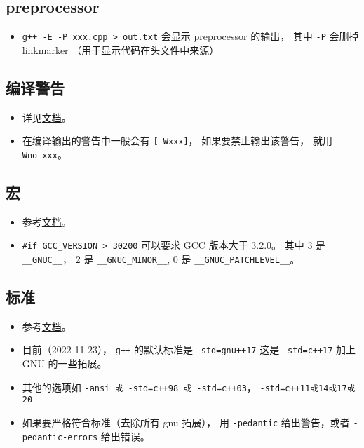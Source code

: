 \subsection{preprocessor}
\begin{itemize}
\item \verb|g++ -E -P xxx.cpp > out.txt| 会显示 preprocessor 的输出， 其中 \verb|-P| 会删掉 linkmarker （用于显示代码在头文件中来源）
\end{itemize}

\subsection{编译警告}
\begin{itemize}
\item 详见\href{https://gcc.gnu.org/onlinedocs/gcc/Warning-Options.html}{文档}。
\item 在编译输出的警告中一般会有 \verb|[-Wxxx]|， 如果要禁止输出该警告， 就用 \verb|-Wno-xxx|。
\end{itemize}

\subsection{宏}
\begin{itemize}
\item 参考\href{https://gcc.gnu.org/onlinedocs/cpp/Common-Predefined-Macros.html}{文档}。
\item \verb|#if GCC_VERSION > 30200| 可以要求 GCC 版本大于 3.2.0。 其中 3 是 \verb|__GNUC__|， 2 是 \verb|__GNUC_MINOR__|,  0 是 \verb|__GNUC_PATCHLEVEL__|。
\end{itemize}


\subsection{标准}
\begin{itemize}
\item 参考\href{https://gcc.gnu.org/onlinedocs/gcc/Standards.html}{文档}。
\item 目前（2022-11-23）， \verb|g++| 的默认标准是 \verb|-std=gnu++17| 这是 \verb|-std=c++17| 加上 GNU 的一些拓展。
\item 其他的选项如 \verb|-ansi 或 -std=c++98 或 -std=c++03|， \verb|-std=c++11或14或17或20|
\item 如果要严格符合标准（去除所有 gnu 拓展）， 用 \verb|-pedantic| 给出警告，或者 \verb|-pedantic-errors| 给出错误。
\end{itemize}
